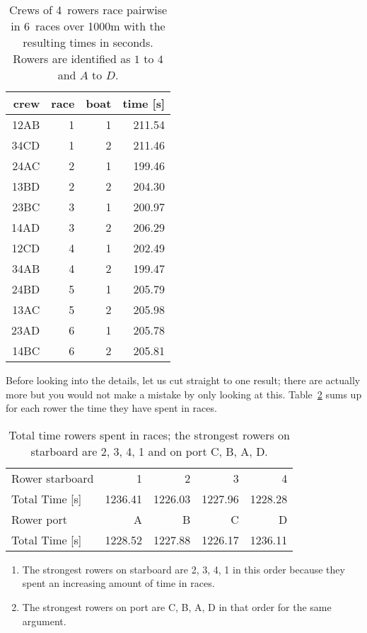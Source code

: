 \documentclass[a4paper,11pt]{article}
\begin{document}
\begin{table}[ht]
\centering
\begin{tabular}{rrrr}
  \toprule
 crew & race & boat & time [s] \\ 
  \midrule
 12AB &   1 & 1 & 211.54 \\ 
 34CD &   1 & 2 & 211.46 \\ 
 24AC &   2 & 1 & 199.46 \\ 
 13BD &   2 & 2 & 204.30 \\ 
 23BC &   3 & 1 & 200.97 \\ 
 14AD &   3 & 2 & 206.29 \\ 
 12CD &   4 & 1 & 202.49 \\ 
 34AB &   4 & 2 & 199.47 \\ 
 24BD &   5 & 1 & 205.79 \\ 
 13AC &   5 & 2 & 205.98 \\ 
 23AD &   6 & 1 & 205.78 \\ 
 14BC &   6 & 2 & 205.81 \\ 
   \bottomrule
\end{tabular}
  \caption{\label{tab:races} Crews of 4~rowers race pairwise in 6~races
  over 1000m with the resulting times in seconds. Rowers are identified
  as $1$ to $4$ and $A$ to $D$.}
\end{table}

\iffalse
Before looking into the details, let us cut straight to one result; there
are actually more but you would not make a mistake by only looking at
this. Table~\ref{tab:basic} sums up for each rower the time they have
spent in races.

\begin{table}[ht]
\centering
\begin{tabular}{l rrrr}
  \toprule
Rower starboard & 1 & 2 & 3 & 4 \\
Total Time [s]  & 1236.41 & 1226.03 & 1227.96 & 1228.28 \\
  \midrule
Rower port      & A & B & C & D \\ 
Total Time [s]  & 1228.52 & 1227.88 & 1226.17 & 1236.11 \\ 
  \bottomrule
\end{tabular}
  \caption{\label{tab:basic} Total time rowers spent in races; the
  strongest rowers on starboard are 2, 3, 4, 1 and on port C, B, A, D.}
\end{table}

\begin{enumerate}
\item The strongest rowers on starboard are 2, 3, 4, 1 in this order
because they spent an increasing amount of time in races.
\item The strongest rowers on port are C, B, A, D in that order for the
same argument.
\end{enumerate}
\end{document}
